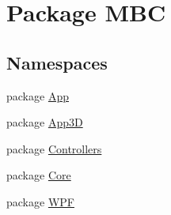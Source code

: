 \hypertarget{namespace_m_b_c}{\section{Package M\-B\-C}
\label{namespace_m_b_c}
}
\subsection*{Namespaces}
\begin{DoxyCompactItemize}
\item 
package \hyperlink{namespace_m_b_c_1_1_app}{App}
\item 
package \hyperlink{namespace_m_b_c_1_1_app3_d}{App3\-D}
\item 
package \hyperlink{namespace_m_b_c_1_1_controllers}{Controllers}
\item 
package \hyperlink{namespace_m_b_c_1_1_core}{Core}
\item 
package \hyperlink{namespace_m_b_c_1_1_w_p_f}{W\-P\-F}
\end{DoxyCompactItemize}
